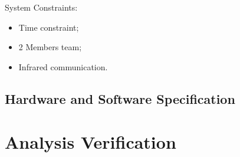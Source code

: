 \documentclass[12pt, letterpaper]{report}
\begin{document}
System Constraints:
\begin{itemize}
	\item Time constraint;
	\item 2 Members team;
	\item Infrared communication.
\end{itemize}
\subsection{Hardware and Software Specification}

\section{Analysis Verification}


\end{document}
